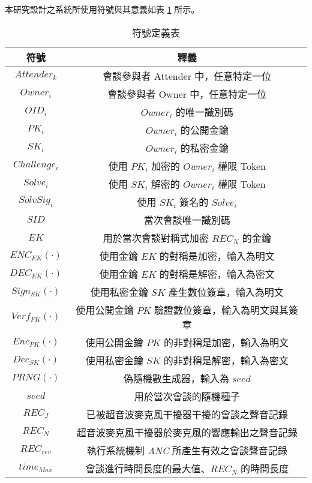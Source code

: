     本研究設計之系統所使用符號與其意義如表 \ref{table:tab.symbol} 所示。

\begin{table}[H]
    \centering
    \caption{符號定義表}
    \label{table:tab.symbol}
    \begin{tabular}{ c c }
        \hline
        \bf{符號} & \bf{釋義} \\
        \hline
        $Attender_{k}$  & 會談參與者 Attender 中，任意特定一位 \\
        $Owner_{i}$     & 會談參與者 Owner 中，任意特定一位 \\
        $OID_{i}$       & $Owner_{i}$ 的唯一識別碼 \\
        $PK_{i}$        & $Owner_{i}$ 的公開金鑰 \\
        $SK_{i}$        & $Owner_{i}$ 的私密金鑰 \\
        $Challenge_{i}$ & 使用 $PK_{i}$ 加密的 $Owner_{i}$ 權限 Token \\
        $Solve_{i}$     & 使用 $SK_{i}$ 解密的 $Owner_{i}$ 權限 Token \\
        $SolvSig_{i}$   & 使用 $SK_{i}$ 簽名的 $Solve_{i}$ \\
        $SID$           & 當次會談唯一識別碼 \\
        $EK$            & 用於當次會談對稱式加密 $REC_{N}$ 的金鑰 \\
        $ENC_{EK}(·)$   & 使用金鑰 $EK$ 的對稱是加密，輸入為明文 \\
        $DEC_{EK}(·)$   & 使用金鑰 $EK$ 的對稱是解密，輸入為密文 \\
        $Sign_{SK}(·)$  & 使用私密金鑰 $SK$ 產生數位簽章，輸入為明文 \\
        $Verf_{PK}(·)$  & 使用公開金鑰 $PK$ 驗證數位簽章，輸入為明文與其簽章 \\
        $Enc_{PK}(·)$   & 使用公開金鑰 $PK$ 的非對稱是加密，輸入為明文 \\
        $Dec_{SK}(·)$   & 使用私密金鑰 $SK$ 的非對稱是解密，輸入為密文 \\
        $PRNG(·)$       & 偽隨機數生成器，輸入為 $seed$  \\
        $seed$          & 用於當次會談的隨機種子 \\
        $REC_{J}$       & 已被超音波麥克風干擾器干擾的會談之聲音記錄 \\
        $REC_{N}$       & 超音波麥克風干擾器於麥克風的響應輸出之聲音記錄 \\
        $REC_{rev}$     & 執行系統機制 {\it ANC} 所產生有效之會談聲音記錄 \\
        $time_{Max}$    & 會談進行時間長度的最大值、$REC_{N}$ 的時間長度 \\

    \end{tabular}
\end{table}


